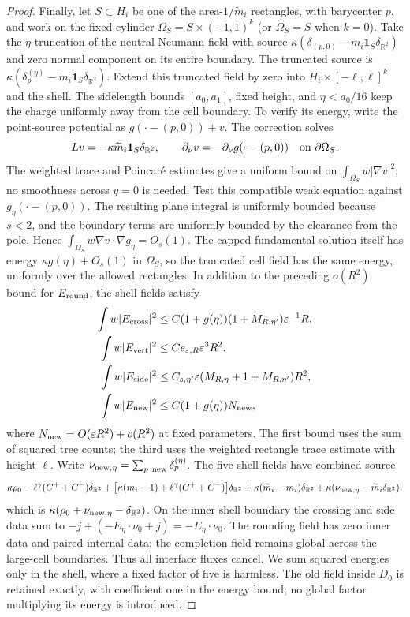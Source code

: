\begin{proof}
Finally, let $S\subset H_i$ be one of the area-$1/\widetilde m_i$
rectangles, with barycenter $p$, and work on the fixed cylinder
$\Omega_S=S\times(-1,1)^k$ (or $\Omega_S=S$ when $k=0$).
Take the $\eta$-truncation of the neutral Neumann field with source
$\kappa(\delta_{(p,0)}-\widetilde m_i\mathbf1_S\delta_{\mathbb R^2})$
and zero normal component on its entire boundary.  The truncated source is
$\kappa(\delta_p^{(\eta)}-\widetilde m_i\mathbf1_S\delta_{\mathbb R^2})$.
Extend this truncated field by zero into $H_i\times[-\ell,\ell]^k$
and the shell.  The sidelength bounds $[a_0,a_1]$, fixed height, and
$\eta<a_0/16$ keep the charge uniformly away from the cell boundary.
To verify its energy, write the point-source potential as
$g(\cdot-(p,0))+v$. The correction solves
\[
 Lv=-\kappa\widetilde m_i\mathbf1_S\delta_{\mathbb R^2},\qquad
 \partial_\nu v=-\partial_\nu g(\cdot-(p,0))
                       \quad\hbox{on }\partial\Omega_S.
\]
The weighted trace and Poincar\'e estimates give a uniform bound on
$\int_{\Omega_S}w|\nabla v|^2$; no smoothness across $y=0$ is needed.
Test this compatible weak equation against $g_\eta(\cdot-(p,0))$.
The resulting plane integral is uniformly bounded because $s<2$, and
the boundary terms are uniformly bounded by the clearance from the pole.
Hence $\int_{\Omega_S}w\nabla v\cdot\nabla g_\eta=O_s(1)$.
The capped fundamental solution itself has energy
$\kappa g(\eta)+O_s(1)$ in $\Omega_S$, so the truncated cell field has
the same energy, uniformly over the allowed rectangles.
In addition to the preceding $o(R^2)$ bound for $E_{\rm round}$,
the shell fields satisfy
\begin{align*}
 \int w|E_{\rm cross}|^2
   &\le C(1+g(\eta))(1+M_{R,\eta'})\varepsilon^{-1}R,\\
 \int w|E_{\rm vert}|^2
   &\le C e_{\varepsilon,R}\varepsilon^3R^2,\\
 \int w|E_{\rm side}|^2
   &\le C_{s,\eta'}\varepsilon(M_{R,\eta}+1+M_{R,\eta'})R^2,\\
 \int w|E_{\rm new}|^2
   &\le C(1+g(\eta))N_{\rm new},
\end{align*}
where $N_{\rm new}=O(\varepsilon R^2)+o(R^2)$ at fixed parameters.
The first bound uses the sum of squared tree counts; the third
uses the weighted rectangle trace estimate with height $\ell$.
Write $\nu_{{\rm new},\eta}=\sum_{p\ {\rm new}}\delta_p^{(\eta)}$.
The five shell fields have combined source
\[
 \kappa\rho_0
 -\ell^\gamma(C^++C^-)\delta_{\mathbb R^2}
 +\bigl[\kappa(m_i-1)+\ell^\gamma(C^++C^-)\bigr]\delta_{\mathbb R^2}
 +\kappa(\widetilde m_i-m_i)\delta_{\mathbb R^2}
 +\kappa(\nu_{{\rm new},\eta}-\widetilde m_i\delta_{\mathbb R^2}),
\]
which is $\kappa(\rho_0+\nu_{{\rm new},\eta}-\delta_{\mathbb R^2})$.
On the inner shell boundary the crossing and side data sum to
$-j+(-E_\eta\cdot\nu_0+j)=-E_\eta\cdot\nu_0$.
The rounding field has zero inner data and paired internal data;
the completion field remains global across the large-cell boundaries.
Thus all interface fluxes cancel.  We sum squared energies only in
the shell, where a fixed factor of five is harmless.  The old field
inside $D_0$ is retained exactly, with coefficient one in the energy
bound; no global factor multiplying its energy is introduced.


\end{proof}
